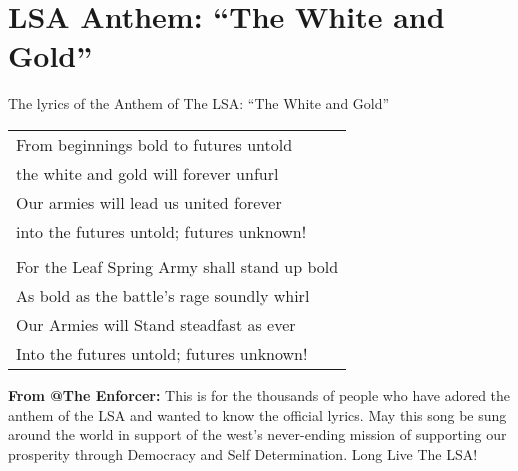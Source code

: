 \section{LSA Anthem: ``The White and Gold''}

The lyrics of the Anthem of The LSA: ``The White and Gold''

\vspace{5mm}
\begin{tabular}{l}
From beginnings bold to futures untold \\
the white and gold will forever unfurl \\
Our armies will lead us united forever \\
into the futures untold; futures unknown! \\
\\
For the Leaf Spring Army shall stand up bold \\
As bold as the battle's rage soundly whirl \\
Our Armies will Stand steadfast as ever \\
Into the futures untold; futures unknown! \\
\end{tabular}

\vspace{5mm}
\textbf{From @The Enforcer:}
This is for the thousands of people who have adored the anthem of the LSA 
and wanted to know the official lyrics. May this song be sung around the world
in support of the west's never-ending mission of supporting our prosperity
through Democracy and Self Determination. Long Live The LSA!
